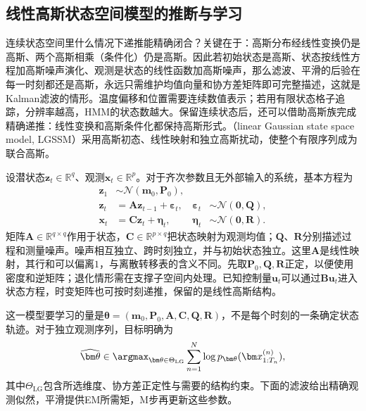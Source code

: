 \subsection{线性高斯状态空间模型的推断与学习}
\label{sec:pgm-dynamic-lgssm-model}

连续状态空间里什么情况下递推能精确闭合？关键在于：高斯分布经线性变换仍是高斯、两个高斯相乘（条件化）仍是高斯。因此若初始状态是高斯、状态按线性方程加高斯噪声演化、观测是状态的线性函数加高斯噪声，那么滤波、平滑的后验在每一时刻都还是高斯，永远只需维护均值向量和协方差矩阵即可完整描述，这就是Kalman滤波的情形。温度偏移和位置需要连续数值表示；若用有限状态格子追踪，分辨率越高，HMM的状态数越大。保留连续状态后，还可以借助高斯族完成精确递推：线性变换和高斯条件化都保持高斯形式。（linear Gaussian state space model, LGSSM）采用高斯初态、线性映射和独立高斯扰动，使整个有限序列成为联合高斯。

设潜状态$\bm{z}_t\in\mathbb{R}^{q}$、观测$\bm{x}_t\in\mathbb{R}^{p}$。对于齐次参数且无外部输入的系统，基本方程为
\begin{equation}
  \begin{aligned}
    \bm{z}_1&\sim\mathcal{N}(\bm{m}_0,\bm{P}_0),\\
    \bm{z}_t&=\bm{A}\bm{z}_{t-1}+\bm{\varepsilon}_t,
      &\bm{\varepsilon}_t&\sim\mathcal{N}(\bm{0},\bm{Q}),\\
    \bm{x}_t&=\bm{C}\bm{z}_t+\bm{\eta}_t,
      &\bm{\eta}_t&\sim\mathcal{N}(\bm{0},\bm{R}).
  \end{aligned}
  \label{eq:pgm-dynamic-lgssm}
\end{equation}
矩阵$\bm{A}\in\mathbb{R}^{q\times q}$作用于状态，$\bm{C}\in\mathbb{R}^{p\times q}$把状态映射为观测均值；$\bm{Q}$、$\bm{R}$分别描述过程和测量噪声。噪声相互独立、跨时刻独立，并与初始状态独立。这里$\bm{A}$是线性映射，其行和可以偏离$1$，与离散转移表的含义不同。先取$\bm{P}_0,\bm{Q},\bm{R}$正定，以便使用密度和逆矩阵；退化情形需在支撑子空间内处理。已知控制量$\bm{u}_t$可以通过$\bm{B}\bm{u}_t$进入状态方程，时变矩阵也可按时刻递推，保留的是线性高斯结构。

这一模型要学习的量是$\bm\theta=(\bm m_0,\bm P_0,\bm A,\bm C,\bm Q,\bm R)$，不是每个时刻的一条确定状态轨迹。对于独立观测序列，目标明确为
\begin{equation}
  \widehat{\bm\theta}\in\argmax_{\bm\theta\in\Theta_{\mathrm{LG}}}
    \sum_{n=1}^{N}\log p_{\bm\theta}(\bm x^{(n)}_{1:T_n}),
  \label{eq:pgm-dynamic-lgssm-objective}
\end{equation}
其中$\Theta_{\mathrm{LG}}$包含所选维度、协方差正定性与需要的结构约束。下面的滤波给出精确观测似然，平滑提供EM所需矩，M步再更新这些参数。


